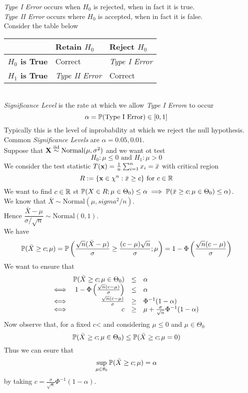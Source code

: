 \documentclass[11pt,a4paper]{article}
\begin{document}
\textit{Type I Error} occurs when $H_0$ is rejected, when in fact it is true.\\
\textit{Type II Error} occurs where $H_0$ is accepted, when in fact it is false.\\
Consider the table below\\
\begin{tabular}{|l|l|l|}
\hline
&\textbf{Retain $H_0$}&\textbf{Reject $H_0$}\\
\hline
\textbf{$H_0$ is True}&Correct&\textit{Type I Error}\\
\textbf{$H_1$ is True}&\textit{Type II Error}&Correct\\
\hline
\end{tabular}\\

\textit{Significance Level} is the rate at which we allow \textit{Type I Error}s to occur
$$\alpha=\mathbb{P}(\text{Type I Error})\in[0,1]$$
Typically this is the level of inprobability at which we reject the null hypothesis.\\
\nb Common \textit{Significance Levels} are $\alpha=0.05,0.01$.\\

Suppose that $\textbf{X}\overset{\text{iid}}{\sim}\text{Normal}(\mu,\sigma^2)$ and we want ot test
$$H_0:\mu\leq0\text{ and }H_1:\mu>0$$
We consider the test statistic $T(\textbf{x})=\frac{1}{n}\sum_{i=1}^nx_i=\bar{x}$ with critical region
$$R:=\{\textbf{x}\in\chi^n:\bar{x}\geq c\}\text{ for }c\in\mathbb{R}$$
We want to find $c\in\mathbb{R}$ st $\mathbb{P}(X\in R;\mu\in\Theta_0)\leq\alpha\implies\mathbb{P}(\bar{x}\geq c;\mu\in\Theta_0)\leq\alpha)$.\\
We know that $\bar{X}\sim\text{Normal}(\mu,sigma^2/n)$.\\
Hence $\dfrac{\bar{X}-\mu}{\sigma/\sqrt{n}}\sim\text{Normal}(0,1)$.\\
We have
$$\mathbb{P}(\bar{X}\geq c;\mu)=\mathbb{P}\left(\frac{\sqrt{n}(\bar{X}-\mu)}{\sigma}\geq\frac{(c-\mu)\sqrt{n}}{\sigma};\mu\right)=1-\Phi\left(\frac{\sqrt{n}(c-\mu)}{\sigma}\right)$$
We want to ensure that
\[\begin{array}{rrcl}
&\mathbb{P}(\bar{X}\geq c;\mu\in\Theta_0)&\leq&\alpha\\
\Longleftrightarrow&1-\Phi\left(\frac{\sqrt{n}(c-\mu)}{\sigma}\right)&\leq&\alpha\\
\Longleftrightarrow&\frac{\sqrt{n}(c-\mu)}{\sigma}&\geq&\Phi^{-1}(1-\alpha)\\
\Longleftrightarrow&c&\geq&\mu+\frac{\sigma}{\sqrt{n}}\Phi^{-1}(1-\alpha)
\end{array}\]
Now observe that, for a fixed $c$< and considering $\mu\leq0$ and $\mu\in\Theta_0$
$$\mathbb{P}(\bar{X}\geq c;\mu\in\Theta_0)\leq\mathbb{P}(\bar{X}\geq c;\mu=0)$$
Thus we can esure that
$$\sup_{\mu\in\theta_0}\mathbb{P}(\bar{X}\geq c;\mu)=\alpha$$
by taking $c=\frac{\sigma}{\sqrt{n}}\Phi^{-1}(1-\alpha)$.\\
\end{document}

